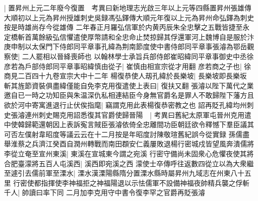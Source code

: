 |{
	置昇州上元二年廢今復置　考異曰新地理志光啟三年以上元等四縣置昇州張雄傳大順初以上元為昇州授雄刺史吳録馮弘鐸傳大順元年復以上元為昇州命弘鐸為刺史按是時雄尚存今從雄傳}
二年春正月羅弘信軍於内黄丙辰朱全忠擊之五戰皆捷至永定橋斬首萬餘級弘信懼遣使厚幣請和全忠命止焚掠歸其俘還軍河上魏博自是服於汴　庚申制以太保門下侍郎同平章事孔緯為荆南節度使中書侍郎同平章事張濬為鄂岳觀察使|{
	二人罷相以晉絳喪師也}
以翰林學士承旨兵部侍郎崔昭緯同平章事御史中丞徐彦若為戶部侍郎同平章事昭緯慎由從子|{
	崔慎由相宣宗從才用翻}
彦若商之子也|{
	徐商見二百四十九卷宣宗大中十二年}
楊復恭使人刼孔緯於長樂坡|{
	長樂坡即長樂坂}
斬其旌節資裝俱盡緯僅能自免李克用復遣使上表曰|{
	復扶又翻}
張濬以陛下萬代之業邀自已一時之功知臣與朱温深仇私相連結臣今身無官爵名是罪人不敢歸陛下藩方且欲於河中寄寓進退行止伏俟指麾|{
	竊謂克用此表楊復恭密教之也}
詔再貶孔緯均州刺史張濬連州刺史賜克用詔悉復其官爵使歸晉陽　|{
	考異曰舊紀太原軍屯晉州克用遣中使韓歸範還朝因上表訴寃言賊臣張濬依倚全忠離間功臣朝廷欲令釋憾下羣臣議其可否左僕射韋昭度等議云云在十二月按是年昭度討陳敬瑄舊紀誤今從實録}
孫儒盡舉淮蔡之兵濟江癸酉自潤州轉戰而南田頵安仁義屢敗退楊行密城戍皆望風奔潰儒將李從立奄至宣州東溪|{
	東溪在宣城東今謂之宛溪}
行密守備尚未固衆心危懼夜使其將合肥臺濛將五百人屯溪西|{
	溪西即宛溪之西}
濛使士卒傳呼往返數四從立以為大衆繼至遽引去儒前軍至溧水|{
	溧水漢溧陽縣隋分置溧水縣時屬昇州九域志在州東八十五里}
行密使都指揮使李神福拒之神福陽退以示怯儒軍不設備神福夜帥精兵襲之俘斬千人|{
	帥讀曰率下同}
二月加李克用守中書令復李罕之官爵再貶張濬

